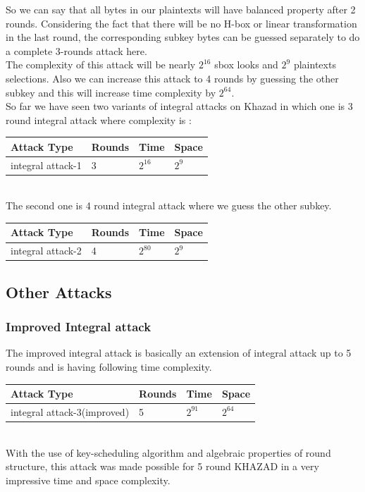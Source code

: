 \documentclass[preprint]{transcrypto}
\begin{document}
So we can say that all bytes in our plaintexts will have balanced property after 2 rounds. Considering the fact that there will be no H-box or linear transformation in the last round, the corresponding subkey bytes can be guessed separately to do a complete 3-rounds attack here.\\
The complexity of this attack will be nearly $2^{16}$ sbox looks and $2^9$ plaintexts selections. Also we can increase this attack to 4 rounds by guessing the other subkey and this will increase time complexity by $2^{64}$.\\
So far we have seen two variants of integral attacks on Khazad in which one is 3 round integral attack where complexity is : \\
\begin{table}[h]
\centering
\begin{tabular}{|l|l|l|l|}
\hline
Attack Type     & Rounds & Time     & Space \\ \hline
integral attack-1 & 3      & $2^{16}$ & $2^9$ \\ \hline
\end{tabular}
\end{table}
\\
The second one is 4 round integral attack where we guess the other subkey.
\begin{table}[h]
\centering
\begin{tabular}{|l|l|l|l|}
\hline
Attack Type     & Rounds & Time     & Space \\ \hline
integral attack-2 & 4      & $2^{80}$ & $2^9$ \\ \hline
\end{tabular}
\end{table}


\newpage

\subsection{Other Attacks}
\subsubsection{Improved Integral attack}\cite{2}
The improved integral attack is basically an extension of integral attack up to 5 rounds and is having following time complexity.\cite{1}
\begin{table}[h]
\centering
\begin{tabular}{|l|l|l|l|}
\hline
Attack Type     & Rounds & Time     & Space \\ \hline
integral attack-3(improved) & 5      & $2^{91}$ & $2^{64}$ \\ \hline
\end{tabular}
\end{table}\\
With the use of key-scheduling algorithm and algebraic properties of round structure, this attack was made possible for 5 round KHAZAD in a very impressive time and space complexity. 
\end{document}
